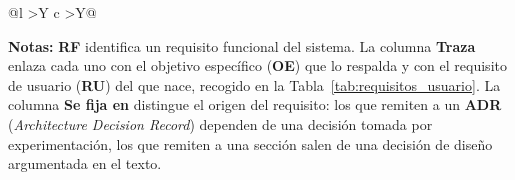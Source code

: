 \begin{table}[htbp]
\begin{tabularx}{\textwidth}{@{}l >{\hsize}Y c >{\hsize}Y@{}}
    \bottomrule
  \end{tabularx}
  \begin{minipage}{0.95\textwidth}
    \vspace{4pt}
    \tiny
    \textbf{Notas:} \textbf{RF} identifica un requisito funcional del sistema.
    La columna \textbf{Traza} enlaza cada uno con el objetivo específico
    (\textbf{OE}) que lo respalda y con el requisito de usuario (\textbf{RU})
    del que nace, recogido en la Tabla~\ref{tab:requisitos_usuario}. La columna
    \textbf{Se fija en} distingue el origen del requisito: los que remiten a un
    \textbf{ADR} (\textit{Architecture Decision Record}) dependen de una
    decisión tomada por experimentación, los que remiten a una sección salen de una decisión
    de diseño argumentada en el texto.
  \end{minipage}
\end{table}
